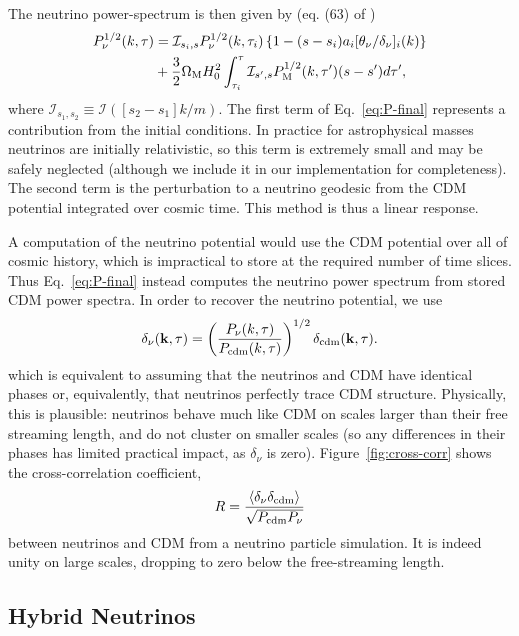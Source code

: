 \documentclass[useAMS, usenatbib]{mnras}
\newcommand{\bs}{\mathbf}
\begin{document}
The neutrino power-spectrum is then given by (eq. (63) of \cite{AHB})
\begin{align}
P_{\nu}^{1/2}(k, \tau) &= \mathcal{I}_{s_i, s}
P_{\nu}^{1/2}(k, \tau_i) \left\{1 - (s - s_i)  a_i [\theta_{\nu}/\delta_{\nu}]_{i}(k)\right\}\nonumber\\
&+ \frac32 \Omega_{\rm M} H_0^2 \int_{\tau_i}^{\tau} \mathcal{I}_{s', s}
P^{1/2}_{\rm M}(k, \tau') (s - s')d \tau', \label{eq:P-final}
\end{align}
where $\mathcal{I}_{s_1, s_2} \equiv \mathcal{I}([s_2 -s_1]k/m)$.
The first term of Eq.~\ref{eq:P-final} represents a contribution from the initial conditions. In practice
for astrophysical masses neutrinos are initially relativistic, so this term is extremely small and may
be safely neglected (although we include it in our implementation for completeness).
The second term is the perturbation to a neutrino geodesic from the CDM potential
integrated over cosmic time. This method is thus a linear response.

A computation of the neutrino potential would use the CDM potential over all of cosmic history, which is impractical
to store at the required number of time slices. Thus Eq.~\ref{eq:P-final} instead computes the neutrino power spectrum
from stored CDM power spectra. In order to recover the neutrino potential, we use
\begin{equation}
\delta_{\nu}(\bs k, \tau) = \left(\frac{P_{\nu}(k,
    \tau)}{P_{\rm cdm}(k, \tau)}\right)^{1/2} \delta_{\rm cdm}(\bs k, \tau).\label{eq:phases}
\end{equation}
which is equivalent to assuming that the neutrinos and CDM have identical phases or, equivalently,
that neutrinos perfectly trace CDM structure. Physically, this is plausible: neutrinos behave much like
CDM on scales larger than their free streaming length, and do not cluster on smaller scales (so any
differences in their phases has limited practical impact, as $\delta_\nu$ is zero).
Figure~\ref{fig:cross-corr} shows the cross-correlation coefficient,
\begin{equation}
R = \frac{\left\langle \delta_\nu \delta_\mathrm{cdm} \right\rangle}{\sqrt{P_{\rm{cdm}} P_{\rm{\nu}}}}
\end{equation}
between neutrinos and CDM from a neutrino particle simulation. It is indeed unity on large scales,
dropping to zero below the free-streaming length.

\subsection{Hybrid Neutrinos}
\label{sec:hybrid}
\end{document}
